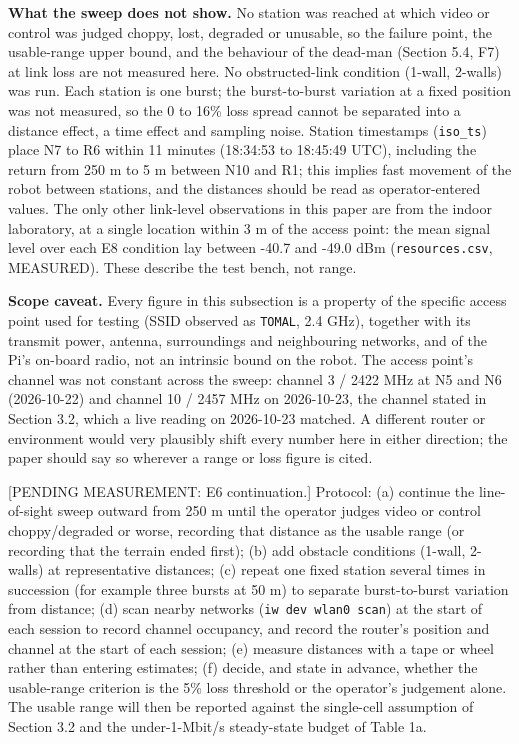 \textbf{What the sweep does not show.} No station was reached at which video or control was judged choppy, lost, degraded or unusable, so the failure point, the usable-range upper bound, and the behaviour of the dead-man (Section 5.4, F7) at link loss are not measured here. No obstructed-link condition (1-wall, 2-walls) was run. Each station is one burst; the burst-to-burst variation at a fixed position was not measured, so the 0 to 16\% loss spread cannot be separated into a distance effect, a time effect and sampling noise. Station timestamps (\texttt{iso\_ts}) place N7 to R6 within 11 minutes (18:34:53 to 18:45:49 UTC), including the return from 250 m to 5 m between N10 and R1; this implies fast movement of the robot between stations, and the distances should be read as operator-entered values. The only other link-level observations in this paper are from the indoor laboratory, at a single location within 3 m of the access point: the mean signal level over each E8 condition lay between -40.7 and -49.0 dBm (\texttt{resources.csv}, MEASURED). These describe the test bench, not range.

\textbf{Scope caveat.} Every figure in this subsection is a property of the specific access point used for testing (SSID observed as \texttt{TOMAL}, 2.4 GHz), together with its transmit power, antenna, surroundings and neighbouring networks, and of the Pi's on-board radio, not an intrinsic bound on the robot. The access point's channel was not constant across the sweep: channel 3 / 2422 MHz at N5 and N6 (2026-10-22) and channel 10 / 2457 MHz on 2026-10-23, the channel stated in Section 3.2, which a live reading on 2026-10-23 matched. A different router or environment would very plausibly shift every number here in either direction; the paper should say so wherever a range or loss figure is cited.

[PENDING MEASUREMENT: E6 continuation.] Protocol: (a) continue the line-of-sight sweep outward from 250 m until the operator judges video or control choppy/degraded or worse, recording that distance as the usable range (or recording that the terrain ended first); (b) add obstacle conditions (1-wall, 2-walls) at representative distances; (c) repeat one fixed station several times in succession (for example three bursts at 50 m) to separate burst-to-burst variation from distance; (d) scan nearby networks (\texttt{iw dev wlan0 scan}) at the start of each session to record channel occupancy, and record the router's position and channel at the start of each session; (e) measure distances with a tape or wheel rather than entering estimates; (f) decide, and state in advance, whether the usable-range criterion is the 5\% loss threshold or the operator's judgement alone. The usable range will then be reported against the single-cell assumption of Section 3.2 and the under-1-Mbit/s steady-state budget of Table 1a.

